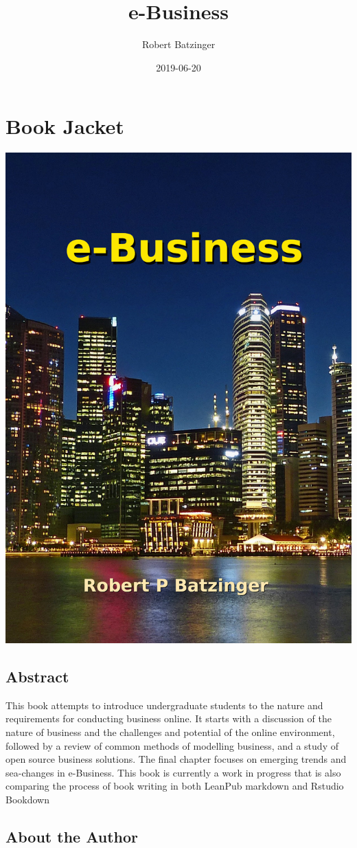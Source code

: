 \documentclass[]{book}
\title{e-Business}
\author{Robert Batzinger}
\date{2019-06-20}
\begin{document}
\maketitle

{
\setcounter{tocdepth}{1}
\tableofcontents
}
\hypertarget{book-jacket}{%
\chapter*{Book Jacket}\label{book-jacket}}

\includegraphics[width=0.5\linewidth]{images/cover11}

\hypertarget{abstract}{%
\section*{Abstract}\label{abstract}}

This book attempts to introduce undergraduate students to the nature and requirements for conducting business online. It starts with a discussion of the nature of business and the challenges and potential of the online environment, followed by a review of common methods of modelling business, and a study of open source business solutions.
The final chapter focuses on emerging trends and sea-changes in e-Business. This book is currently a work in progress that is also comparing the process of book writing in both LeanPub markdown and Rstudio Bookdown

\hypertarget{about-the-author}{%
\section*{About the Author}\label{about-the-author}}
\end{document}
